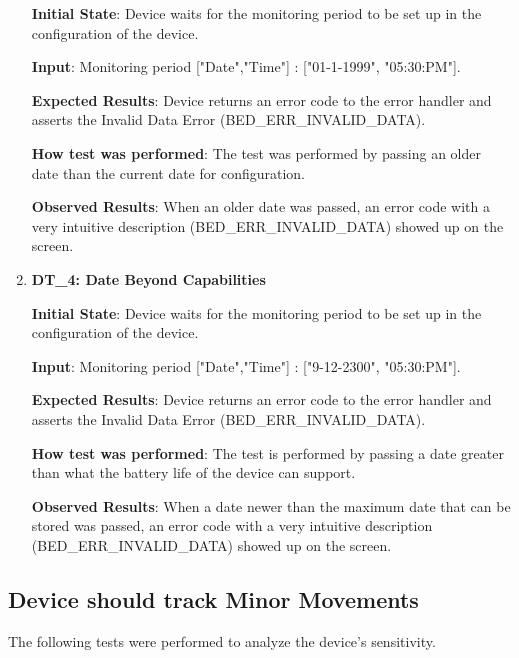 \documentclass[12pt, titlepage]{article}
\begin{document}
\begin{enumerate}
  \textbf{Initial State}: Device waits for the monitoring period to be set up in the configuration of the device.

  \textbf{Input}: Monitoring period ["Date","Time"] : ["01-1-1999", "05:30:PM"].

  \textbf{Expected Results}: Device returns an error code to the error handler and asserts the Invalid Data Error (BED\_ERR\_INVALID\_DATA).

  \textbf{How test was performed}: The test was performed by passing an older date than the current date for configuration.

  \textbf{Observed Results}: When an older date was passed, an error code with a very intuitive description (BED\_ERR\_INVALID\_DATA) showed up on the screen.

  \item{\textbf{DT\_4: Date Beyond Capabilities}\\}\label{DT4}

  \textbf{Initial State}: Device waits for the monitoring period to be set up in the configuration of the device.

  \textbf{Input}: Monitoring period ["Date","Time"] : ["9-12-2300", "05:30:PM"].

  \textbf{Expected Results}: Device returns an error code to the error handler and asserts the Invalid Data Error (BED\_ERR\_INVALID\_DATA).

  \textbf{How test was performed}: The test is performed by passing a date greater than what the battery life of the device can support.

  \textbf{Observed Results}: When a date newer than the maximum date that can be stored was passed, an error code with a very intuitive description (BED\_ERR\_INVALID\_DATA) showed up on the screen.
\end{enumerate}

\subsection{Device should track Minor Movements}
The following tests were performed to analyze the device's sensitivity.
\end{document}
